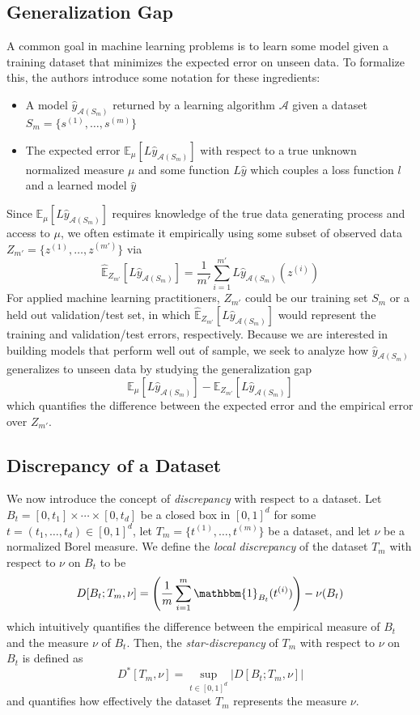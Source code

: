 \documentclass{article}
\begin{document}
\subsection{Generalization Gap}
A common goal in machine learning problems is to learn some model given a training dataset that minimizes the expected error on unseen data. To formalize this, the authors introduce some notation for these ingredients:
\begin{itemize}
    \item A model $\hat{y}_{\mathcal{A}(S_m)}$ returned by a learning algorithm $\mathcal{A}$ given a dataset $S_m = \{s^{(1)}, \ldots, s^{(m)} \}$

    \item The expected error $\mathbb{E}_{\mu}[L \hat{y}_{\mathcal{A}(S_m)}]$ with respect to a true unknown normalized measure $\mu$ and some function $L\hat{y}$ which couples a loss function $l$ and a learned model $\hat{y}$
\end{itemize}
Since $\mathbb{E}_{\mu}[L \hat{y}_{\mathcal{A}(S_m)}]$ requires knowledge of the true data generating process and access to $\mu$, we often estimate it empirically using some subset of observed data $Z_{m'} = \{z^{(1)}, \ldots, z^{(m')} \}$ via
\[\hat{\mathbb{E}}_{Z_{m'}}[L \hat{y}_{\mathcal{A}(S_m)}] = \frac{1}{m'} \sum_{i=1}^{m'} L \hat{y}_{\mathcal{A}(S_m)} (z^{(i)})\]
For applied machine learning practitioners, $Z_{m'}$ could be our training set $S_{m}$ or a held out validation/test set, in which $\hat{\mathbb{E}}_{Z_{m'}}[L \hat{y}_{\mathcal{A}(S_m)}]$ would represent the training and validation/test errors, respectively. Because we are interested in building models that perform well out of sample, we seek to analyze how $\hat{y}_{\mathcal{A}(S_m)}$ generalizes to unseen data by studying the generalization gap
\[\mathbb{E}_{\mu}[L \hat{y}_{\mathcal{A}(S_m)}] - \hat{\mathbb{E}}_{Z_{m'}}[L \hat{y}_{\mathcal{A}(S_m)}]\]
which quantifies the difference between the expected error and the empirical error over $Z_{m'}$.

\subsection{Discrepancy of a Dataset}
We now introduce the concept of \textit{discrepancy} with respect to a dataset. Let $B_t = [0, t_1] \times \cdots \times [0, t_d]$ be a closed box in $[0, 1]^d$ for some $t = (t_1, \ldots, t_d) \in [0, 1]^d$, let $T_m = \{t^{(1)}, \ldots, t^{(m)}\}$ be a dataset, and let $\nu$ be a normalized Borel measure. We define the \textit{local discrepancy} of the dataset $T_m$ with respect to $\nu$ on $B_t$ to be
\[D[B_t ; T_m, \nu] = \left(\frac{1}{m} \sum_{i=1}^{m} \mathbbm{1}_{B_t} (t^{(i)}) \right) - \nu(B_t)\]
which intuitively quantifies the difference between the empirical measure of $B_t$ and the measure $\nu$ of $B_t$. Then, the \textit{star-discrepancy} of $T_m$ with respect to $\nu$ on $B_t$ is defined as
\[D^* [T_m, \nu] = \sup_{t \in [0, 1]^d} \left| D[B_t ; T_m, \nu] \right|\]
and quantifies how effectively the dataset $T_m$ represents the measure $\nu$.
\end{document}
